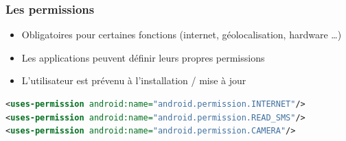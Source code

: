 \documentclass{beamer}
\begin{document}
\begin{frame}[fragile]
\frametitle{Les permissions}
\begin{itemize}
  \item Obligatoires pour certaines fonctions (internet, géolocalisation,
  hardware \ldots)
  \item Les applications peuvent définir leurs propres permissions
  \item L'utilisateur est prévenu à l'installation / mise à jour
 \end{itemize}
 \begin{lstlisting}[language=XML]
<uses-permission android:name="android.permission.INTERNET"/>
<uses-permission android:name="android.permission.READ_SMS"/>
<uses-permission android:name="android.permission.CAMERA"/>
\end{lstlisting}
\end{frame} 
\end{document}
